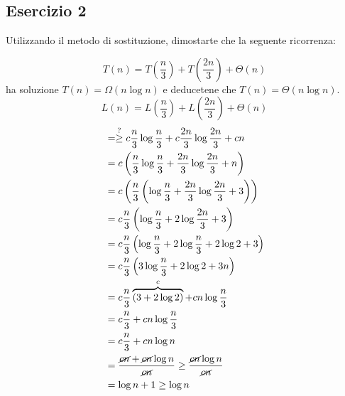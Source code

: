 \documentclass[12pt]{article}
\begin{document}
\subsection{Esercizio 2}
Utilizzando il metodo di sostituzione, dimostarte che la seguente ricorrenza:

\[T(n) = T\left(\frac{n}{3}\right) + T\left(\frac{2n}{3}\right) + \Theta(n)\]
ha soluzione $T(n) = \Omega(n \log n)$ e deducetene che $T(n) = \Theta(n \log n)$.
\[L(n) = L\left(\frac{n}{3}\right) + L\left(\frac{2n}{3}\right) + \Theta(n)\] 
\[
\begin{split}
&= \stackrel{?}{\ge} c\frac{n}{3} \log{\frac{n}{3}} + c\frac{2n}{3} \log \frac{2n}{3} + cn\\
&= c\left(\frac{n}{3}\log \frac{n}{3} + \frac{2n}{3} \log \frac{2n}{3} + n\right)\\
&= c\left(\frac{n}{3}\left(\log \frac{n}{3} + \frac{2n}{3}\log \frac{2n}{3} + 3\right)\right)\\
&= c\frac{n}{3} \left(\log \frac{n}{3} + 2\log \frac{2n}{3} + 3\right)\\
&=c\frac{n}{3} \left(\log \frac{n}{3} + 2\log\frac{n}{3} + 2\log2 + 3\right)\\
&= c\frac{n}{3}\left(3 \log \frac{n}{3} + 2\log2 +3n\right)\\
&= c\frac{n}{3}\overbrace{(3 + 2\log 2)}^{c} + cn \log \frac{n}{3}\\
&= c\frac{n}{3} + cn \log \frac{n}{3}\\
&= c\frac{n}{3} + cn \log{n}\\
&= \frac{\cancel{cn} + \cancel{cn} \log n}{\cancel{cn}} \ge \frac{\cancel{cn} \log n}{\cancel{cn}}\\
&= \log n + 1 \ge \log n\\
\end{split}
\]    
\end{document}
